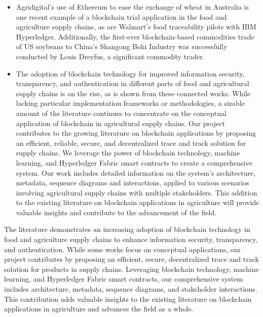 \begin{itemize}
    \item Agridigital's use of Ethereum to ease the exchange of \cite{bib3}
    wheat in Australia is one recent example of a blockchain 
    trial application in the food and agriculture supply 
    chains, as are Walmart's food traceability pilots with 
    IBM Hyperledger. Additionally, the first-ever 
    blockchain-based commodities trade of US soybeans to 
    China's Shangong Bohi Industry was successfully 
    conducted by Louis Dreyfus, a significant commodity 
    trader.
    
    \item The adoption of blockchain technology for improved \cite{bib4}
    information security, transparency, and authentication in 
    different parts of food and agricultural supply chains is 
    on the rise, as is shown from these connected works. 
    While lacking particular implementation frameworks or 
    methodologies, a sizable amount of the literature 
    continues to concentrate on the conceptual application of 
    blockchain in agricultural supply chains. 
    Our project contributes to the growing literature on 
    blockchain applications by proposing an efficient, 
    reliable, secure, and decentralized trace and track solution 
    for supply chains. We leverage the power of 
    blockchain technology, machine learning, and 
    Hyperledger Fabric smart contracts to create a 
    comprehensive system. Our work includes detailed 
    information on the system's architecture, metadata, 
    sequence diagrams and interactions, applied to various 
    scenarios involving agricultural supply chains with 
    multiple stakeholders. This addition to the existing 
    literature on blockchain applications in agriculture will 
    provide valuable insights and contribute to the 
    advancement of the field.
  \end{itemize}


\par
\noindent The literature demonstrates an increasing adoption of blockchain technology in food and agriculture supply chains to enhance information security, transparency, and authentication. While some works focus on conceptual applications, our project contributes by proposing an efficient, secure, decentralized trace and track solution for products in supply chains. Leveraging blockchain technology, machine learning, and Hyperledger Fabric smart contracts, our comprehensive system includes architecture, metadata, sequence diagrams, and stakeholder interactions. This contribution adds valuable insights to the existing literature on blockchain applications in agriculture and advances the field as a whole.